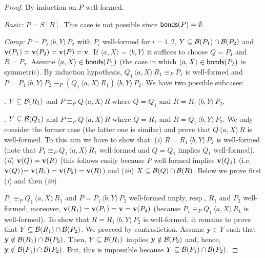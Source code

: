 \documentclass[11pt]{article}
\newcommand{\bonds}{{\sf bonds}}
\newcommand{\vect}[1]{\mathbf{#1}}
\newcommand{\unionc}[1]{\,\langle #1 \rangle\,}
\newcommand{\boundary}[1]{\ensuremath{{\cal B}(#1)}}
\newcommand{\velocity}[1]{{\bf v}(#1)}
\begin{document}
\smallskip\noindent
\begin{proof}  By induction on $P$ well-formed.

\par\medskip\noindent
{\em Basic:} $ P = S[B] $. This case is not possible since $\bonds(P) = \emptyset$.
\par\medskip\noindent
{\em Comp:} $ P = P_1 \unionc{b,Y} P_2$ with $P_i$ well-formed for $i=1,2$, $Y
\subseteq \boundary{P_1} \cap \boundary{P_2}$ and $\velocity{P_1} = \velocity{P_2} = \velocity{P}
= \vect{v}$.
If $\langle a, X \rangle = \langle b, Y \rangle$ it suffices to choose $Q=P_1$ and $R=P_2$. Assume
$\langle a, X \rangle \in \bonds(P_1)$ (the case in which $\langle a, X \rangle \in \bonds(P_2)$
is symmetric).  By induction hypothesis, $Q_1 \unionc{a,X} R_1 \equiv_P P_1$ is
well-formed and $P = P_1 \unionc{b,Y} P_2 \equiv_P (Q_1 \unionc{a, X} R_1) \unionc{b,Y} P_2 $.
We have  two possible subcases:

. $Y \subseteq \boundary{R_1}$ and $P \equiv_P Q  \unionc{a, X} R$ where $Q = Q_1$ and $R
= R_1 \unionc{b, Y} P_2$, 

. $Y \subseteq \boundary{Q_1}$ and $P \equiv_P Q \unionc{a, X} R$ where $Q = R_1$ and $R
= Q_1 \unionc{b, Y} P_2$.
We only consider the former case (the latter one is similar) and prove that $Q \unionc{a,X} R$ is 
well-formed. To this aim we have to show that: ({\it i}) $R = R_1 \unionc{b, Y} P_2$ is
well-formed (note that $P_1 \equiv_P Q_1 \unionc{a,X} R_1$ well-formed and $Q = Q_1$ implies $Q_1$
well-formed), ({\it ii}) $\velocity{Q} = \velocity{R}$ (this follows easily because $P$ well-formed
implies $\velocity{Q_1}$ (i.e.\ $\velocity{Q}$)$= \velocity{R_1}  = \velocity{P_2} =\velocity{R}$)
and ({\it iii}) $X \subseteq \boundary{Q} \cap \boundary{R}$. Below we prove first ({\it i}) and
then ({\it iii})

\par\smallskip\noindent $P_1 \equiv_P Q_1 \unionc{a,X} R_1$ and $P = P_1 \unionc{b,Y} P_2$
well-formed imply, resp., $R_1$ and $P_2$ well-formed; moreover, $\velocity{R_1} = \velocity{P_1} =
\vect{v} = \velocity{P_2}$ (because $P_1 \equiv_P Q_1 \unionc{a,X} R_1$ is well-formed). To show
that $R = R_1 \unionc{b, Y} P_2$ is well-formed,  it remains to prove that $Y \subseteq
\boundary{R_1} \cap \boundary{P_2}$. We proceed by contradiction. Assume $\vect{y} \in Y$ such that
$\vect{y} \notin \boundary{R_1} \cap \boundary{P_2}$. Then, $Y \subseteq \boundary{R_1}$ implies
$\vect{y} \notin \boundary{P_2}$ and, hence, $\vect{y} \notin \boundary{P_1} \cap \boundary{P_2}$.
But, this is impossible because $Y \subseteq \boundary{P_1} \cap \boundary{P_2}$.


\end{proof}
\end{document}
